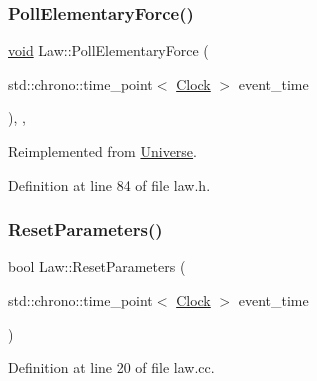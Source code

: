 \subsubsection{\texorpdfstring{Poll\+Elementary\+Force()}{PollElementaryForce()}}
{\footnotesize\ttfamily \mbox{\hyperlink{glad_8h_a950fc91edb4504f62f1c577bf4727c29}{void}} Law\+::\+Poll\+Elementary\+Force (\begin{DoxyParamCaption}\item[{std\+::chrono\+::time\+\_\+point$<$ \mbox{\hyperlink{universe_8h_a0ef8d951d1ca5ab3cfaf7ab4c7a6fd80}{Clock}} $>$}]{event\+\_\+time }\end{DoxyParamCaption})\hspace{0.3cm}{\ttfamily [inline]}, {\ttfamily [final]}, {\ttfamily [virtual]}}



Reimplemented from \mbox{\hyperlink{class_universe_a0c485c504542409cbb5cfd8543c35b11}{Universe}}.



Definition at line 84 of file law.\+h.

\mbox{\label{class_law_a56541ec0b82b8a7c377ae2e6b444205c}} 
\subsubsection{\texorpdfstring{Reset\+Parameters()}{ResetParameters()}}
{\footnotesize\ttfamily bool Law\+::\+Reset\+Parameters (\begin{DoxyParamCaption}\item[{std\+::chrono\+::time\+\_\+point$<$ \mbox{\hyperlink{universe_8h_a0ef8d951d1ca5ab3cfaf7ab4c7a6fd80}{Clock}} $>$}]{event\+\_\+time }\end{DoxyParamCaption})}



Definition at line 20 of file law.\+cc.

